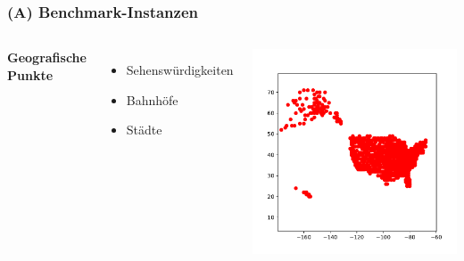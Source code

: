 \documentclass[aspectratio=169]{beamer}
\begin{document}
\begin{frame}
	\frametitle{(A) Benchmark-Instanzen}
	\begin{columns}[c] %
	
	\textbf{Geografische Punkte}
	\begin{itemize}
		\item Sehenswürdigkeiten
		\item Bahnhöfe
		\item Städte
	\end{itemize}
	
	\includegraphics[scale=.5]{cities.pdf}
	

	\end{columns}
	\end{frame}

\end{document}

